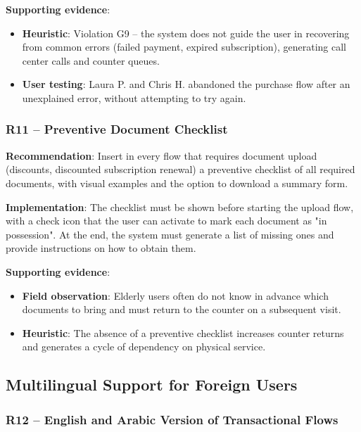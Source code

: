 ﻿\documentclass[11pt,a4paper]{article}
\begin{document}
\textbf{Supporting evidence}:
\begin{itemize}
    \item \textbf{Heuristic}: Violation G9 -- the system does not guide the user
    in recovering from common errors (failed payment, expired subscription),
    generating call center calls and counter queues.
    \item \textbf{User testing}: Laura P. and Chris H. abandoned
    the purchase flow after an unexplained error, without attempting
    to try again.
\end{itemize}

\subsubsection{R11 -- Preventive Document Checklist}
\label{rec:R11}

\textbf{Recommendation}: Insert in every flow that requires document
upload (discounts, discounted subscription renewal) a preventive
checklist of all required documents, with visual examples and the option
to download a summary form.

\textbf{Implementation}: The checklist must be shown before starting
the upload flow, with a check icon that the user can activate to mark
each document as "in possession". At the end, the system must generate a
list of missing ones and provide instructions on how to obtain them.

\textbf{Supporting evidence}:
\begin{itemize}
    \item \textbf{Field observation}: Elderly users often do not know in
    advance which documents to bring and must return to the counter on a
    subsequent visit.
    \item \textbf{Heuristic}: The absence of a preventive checklist increases
    counter returns and generates a cycle of dependency on physical
    service.
\end{itemize}



\subsection{Multilingual Support for Foreign Users}

\subsubsection{R12 -- English and Arabic Version of Transactional Flows}
\label{rec:R12}
\end{document}
